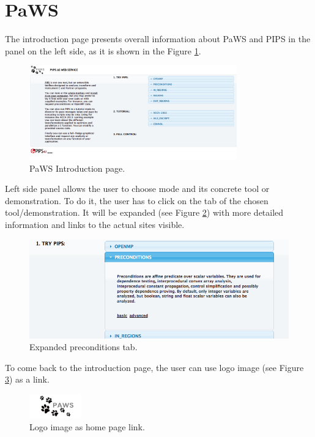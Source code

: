 \section{PaWS}

The introduction page presents overall information about PaWS and PIPS in the panel on the left side, as it is shown in the Figure \ref{fig:intro_page}.

\begin{figure}[h!]
  \centering
  \includegraphics[width=0.8\textwidth]{reportCh4/intro_page}
  \caption{PaWS Introduction page.}
  \label{fig:intro_page}
\end{figure}

Left side panel allows the user to choose mode and its concrete tool or demonstration. To do it, the user has to click on the tab of the chosen tool/demonstration. It will be expanded (see Figure \ref{fig:expanded_tab}) with more detailed information and links to the actual sites visible.

\begin{figure}[h!]
  \centering
  \includegraphics[width=1.0\textwidth]{reportCh4/expanded_tab}
  \caption{Expanded preconditions tab.}
  \label{fig:expanded_tab}
\end{figure}

To come back to the introduction page, the user can use logo image (see Figure \ref{fig:logo_image}) as a link.

\begin{figure}[h!]
  \centering
  \includegraphics[width=0.2\textwidth]{reportCh4/logo_image}
  \caption{Logo image as home page link.}
  \label{fig:logo_image}
\end{figure}
